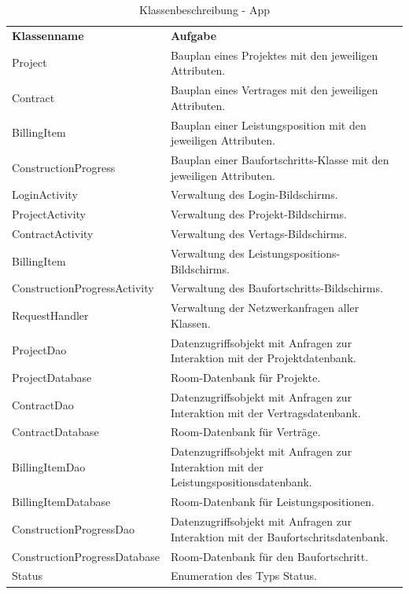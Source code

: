 \clearpage

\begin{table}[h]
	\centering
	\begin{tabularx}{\textwidth}{X X}
		\rowcolor[HTML]{C0C0C0} 
		\textbf{Klassenname} & \textbf{Aufgabe} \\
		Project & Bauplan eines Projektes mit den jeweiligen Attributen.\\
		\rowcolor[HTML]{E7E7E7} 
		Contract & Bauplan eines Vertrages mit den jeweiligen Attributen. \\
		BillingItem & Bauplan einer Leistungsposition mit den jeweiligen Attributen. \\
		\rowcolor[HTML]{E7E7E7} 
		ConstructionProgress & Bauplan einer Baufortschritts-Klasse mit den jeweiligen Attributen. \\
		LoginActivity & Verwaltung des Login-Bildschirms. \\
		\rowcolor[HTML]{E7E7E7} 
		ProjectActivity & Verwaltung des Projekt-Bildschirms. \\
		ContractActivity & Verwaltung des Vertags-Bildschirms. \\
		\rowcolor[HTML]{E7E7E7} 
		BillingItem & Verwaltung des Leistungspositions-Bildschirms. \\
		ConstructionProgressActivity & Verwaltung des Baufortschritts-Bildschirms. \\
		\rowcolor[HTML]{E7E7E7} 
		RequestHandler & Verwaltung der Netzwerkanfragen aller Klassen. \\
		ProjectDao & Datenzugriffsobjekt mit Anfragen zur Interaktion mit der Projektdatenbank. \\
		\rowcolor[HTML]{E7E7E7} 
		ProjectDatabase & Room-Datenbank für Projekte. \\
		ContractDao & Datenzugriffsobjekt mit Anfragen zur Interaktion mit der Vertragsdatenbank. \\
		\rowcolor[HTML]{E7E7E7} 
		ContractDatabase & Room-Datenbank für Verträge. \\
		BillingItemDao & Datenzugriffsobjekt mit Anfragen zur Interaktion mit der Leistungspositionsdatenbank. \\
		\rowcolor[HTML]{E7E7E7} 
		BillingItemDatabase & Room-Datenbank für Leistungspositionen. \\
		ConstructionProgressDao & Datenzugriffsobjekt mit Anfragen zur Interaktion mit der Baufortschritsdatenbank. \\
		\rowcolor[HTML]{E7E7E7} 
		ConstructionProgressDatabase & Room-Datenbank für den Baufortschritt. \\
		Status & Enumeration des Typs Status.
	\end{tabularx}
	\caption{Klassenbeschreibung - App}
	\label{table:klassenbeschreibung-a}
\end{table}
